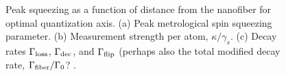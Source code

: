 \documentclass[preprint,aps,pra,onecolumn]{revtex4-1} %
\newcommand{\comment}[1]{{\color{Maroon} #1}}
\begin{document}
\begin{figure}
\begin{minipage}{.49\linewidth}
\centering
{}
\end{minipage}
\begin{minipage}{.49\linewidth}
\centering
{}
\end{minipage}
\caption{Peak squeezing as a function of distance from the nanofiber for optimal quantization axis. (a) Peak metrological spin squeezing parameter. (b) Measurement strength per atom, $\kappa/\gamma_s$. (c) Decay rates $\Gamma_{\rm loss}$, $\Gamma_{\rm dec}$, and $\Gamma_{\rm flip}$ \comment{(perhaps also the total modified decay rate, $\Gamma_{\rm fiber}/\Gamma_0$? }. }\label{Fig::Squeezing_Scaling}
\end{figure}
\end{document}
